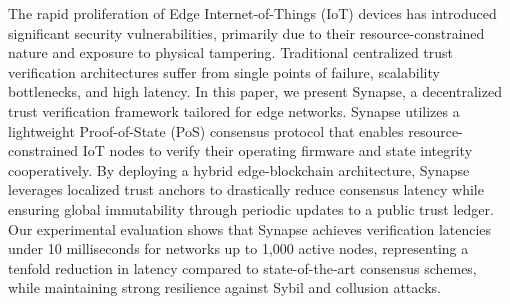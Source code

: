 The rapid proliferation of Edge Internet-of-Things (IoT) devices has introduced significant security vulnerabilities, primarily due to their resource-constrained nature and exposure to physical tampering. Traditional centralized trust verification architectures suffer from single points of failure, scalability bottlenecks, and high latency. In this paper, we present Synapse, a decentralized trust verification framework tailored for edge networks. Synapse utilizes a lightweight Proof-of-State (PoS) consensus protocol that enables resource-constrained IoT nodes to verify their operating firmware and state integrity cooperatively. By deploying a hybrid edge-blockchain architecture, Synapse leverages localized trust anchors to drastically reduce consensus latency while ensuring global immutability through periodic updates to a public trust ledger. Our experimental evaluation shows that Synapse achieves verification latencies under 10 milliseconds for networks up to 1,000 active nodes, representing a tenfold reduction in latency compared to state-of-the-art consensus schemes, while maintaining strong resilience against Sybil and collusion attacks.
